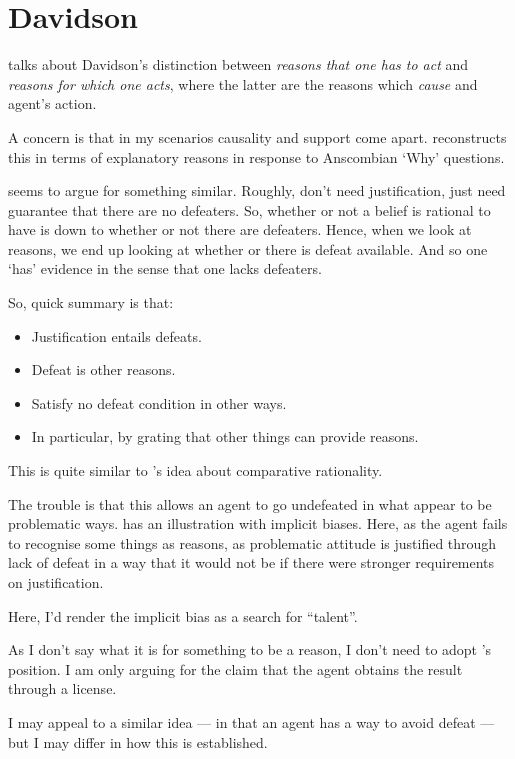 \documentclass[10pt]{article}
\begin{document}
\section{Davidson}
\label{sec:davidson}

\citeauthor{Neta:2019aa} talks about Davidson's distinction between \emph{reasons that one has to act} and \emph{reasons for which one acts}, where the latter are the reasons which \emph{cause} and agent's action.

A concern is that in my scenarios causality and support come apart.
\citeauthor{Neta:2019aa} reconstructs this in terms of explanatory reasons in response to Anscombian `Why' questions.


\newpage

\printbibliography


\newpage

\begin{note}[Schroeder]
  \textcite{Schroeder:2011aa} seems to argue for something similar.
  Roughly, don't need justification, just need guarantee that there are no defeaters.
  So, whether or not a belief is rational to have is down to whether or not there are defeaters.
  Hence, when we look at reasons, we end up looking at whether or there is defeat available.
  And so one `has' evidence in the sense that one lacks defeaters.

  So, quick summary is that:
  \begin{itemize}
  \item Justification entails defeats.
  \item Defeat is other reasons.
  \item Satisfy no defeat condition in other ways.
  \item In particular, by grating that other things can provide reasons.
  \end{itemize}

  This is quite similar to \citeauthor{Lord:2018aa}'s idea about comparative rationality.

  The trouble is that this allows an agent to go undefeated in what appear to be problematic ways.
  \textcite{Schmidt:2019aa} has an illustration with implicit biases.
  Here, as the agent fails to recognise some things as reasons, as problematic attitude is justified through lack of defeat in a way that it would not be if there were stronger requirements on justification.

  Here, I'd render the implicit bias as a search for ``talent''.

  As I don't say what it is for something to be a reason, I don't need to adopt \citeauthor{Schroeder:2011aa}'s position.
  I am only arguing for the claim that the agent obtains the result through a license.

  I may appeal to a similar idea --- in that an agent has a way to avoid defeat --- but I may differ in how this is established.
\end{note}
\end{document}
